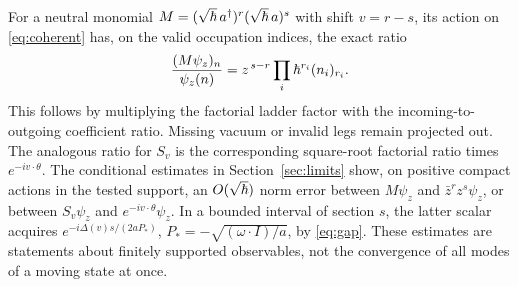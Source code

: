 For a neutral monomial \(M=(\sqrt{\hbar}\,a^\dagger)^r(\sqrt{\hbar}\,a)^s\) with shift \(v=r-s\), its action on \eqref{eq:coherent} has, on the valid occupation indices, the exact ratio
\begin{equation}\label{eq:factorial}
             \frac{(M\psi_z)_n}{\psi_z(n)}
                 = z^{\,s-r}\prod_i\hbar^{r_i}(n_i)_{r_i}.
\end{equation}
This follows by multiplying the factorial ladder factor with the incoming-to-outgoing coefficient ratio. Missing vacuum or invalid legs remain projected out. The analogous ratio for \(S_v\) is the corresponding square-root factorial ratio times \(e^{-iv\cdot\theta}\). The conditional estimates in Section~\ref{sec:limits} show, on positive compact actions in the tested support, an \(O(\sqrt{\hbar})\) norm error between \(M\psi_z\) and \(\bar z^r z^s\psi_z\), or between \(S_v\psi_z\) and \(e^{-iv\cdot\theta}\psi_z\). In a bounded interval of section \(s\), the latter scalar acquires \(e^{-i\Delta(v)s/(2aP_*)}\), \(P_*=-\sqrt{(\omega\cdot I)/a}\), by \eqref{eq:gap}. These estimates are statements about finitely supported observables, not the convergence of all modes of a moving state at once.

